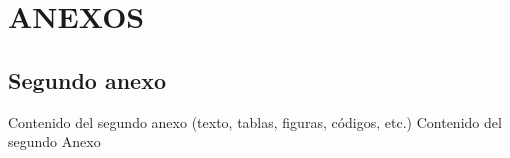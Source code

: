 \documentclass[a4paper, 11pt, spanish, twoside]{article}
\begin{document}
\appto{\bibsetup}{\sloppy}
\printbibliography[heading=bibintoc, title=BIBLIOGRAFÍA] %




\newpage

\section*{ANEXOS} \label{sec:anexos} %

\renewcommand{\thesubsection}{\Alph{subsection}} %
\renewcommand{\thetable}{\Alph{subsection}.\arabic{table}}
\renewcommand{\thefigure}{\Alph{subsection}.\arabic{figure}}
\renewcommand{\thecode}{\Alph{subsection}.\arabic{code}}

\newpage


\newpage
\subsection{Segundo anexo} \label{sec:anexo2}

Contenido del segundo anexo (texto, tablas, figuras, códigos, etc.)
Contenido del segundo Anexo



\end{document}
